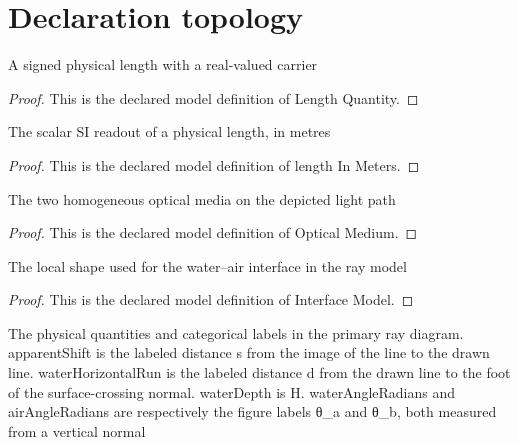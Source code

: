 \section{Declaration topology}
\begin{definition}
  \label{def:physics:phyx-mini-0095:phyxminiproblems-problemphyxmini0095-lengthquantity}
  A signed physical length with a real-valued carrier
\end{definition}
\begin{proof}
  This is the declared model definition of Length Quantity.
\end{proof}
\begin{definition}
  \label{def:physics:phyx-mini-0095:phyxminiproblems-problemphyxmini0095-lengthinmeters}
  The scalar SI readout of a physical length, in metres
\end{definition}
\begin{proof}
  This is the declared model definition of length In Meters.
\end{proof}
\begin{definition}
  \label{def:physics:phyx-mini-0095:phyxminiproblems-problemphyxmini0095-opticalmedium}
  The two homogeneous optical media on the depicted light path
\end{definition}
\begin{proof}
  This is the declared model definition of Optical Medium.
\end{proof}
\begin{definition}
  \label{def:physics:phyx-mini-0095:phyxminiproblems-problemphyxmini0095-interfacemodel}
  The local shape used for the water--air interface in the ray model
\end{definition}
\begin{proof}
  This is the declared model definition of Interface Model.
\end{proof}
\begin{definition}
  \label{def:physics:phyx-mini-0095:phyxminiproblems-problemphyxmini0095-lineshiftrefractionsetup}
  The physical quantities and categorical labels in the primary ray diagram. apparentShift is the labeled distance s from the image of the line to the drawn line. waterHorizontalRun is the labeled distance d from the drawn line to the foot of the surface-crossing normal. waterDepth is H. waterAngleRadians and airAngleRadians are respectively the figure labels θ\_a and θ\_b, both measured from a vertical normal
\end{definition}
